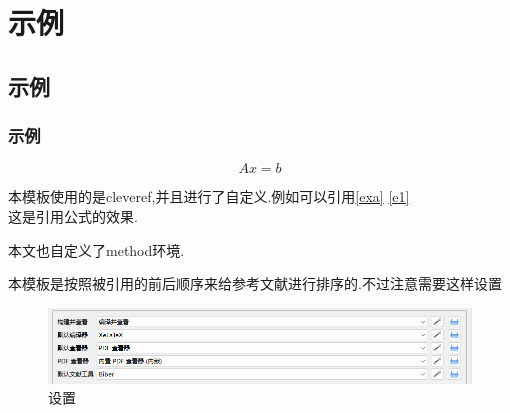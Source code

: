 \setlength{\parindent}{2em} %
\pagestyle{fancy}
\fancyhf{}
\fancyhead[C]{\leftmark}
\fancyfoot[C]{$\cdot$\thepage$\cdot$}
\renewcommand{\headrulewidth}{0.4pt}

\chapter{示例}
\section{示例}
\subsection{示例}

\begin{theorem}\label{exa}
	\begin{equation}\label{e1}
	Ax=b
 \end{equation}
\end{theorem}

\begin{definition}
	本模板使用的是cleveref,并且进行了自定义.例如可以引用\cref{exa} \cref{e1} \\
	这是引用公式的效果.
\end{definition}

\begin{method}
	本文也自定义了method环境.
\end{method}

\cite{1}本模板是按照被引用的前后顺序来给参考文献进行排序的\cite{2}.不过注意需要这样设置
\begin{figure}[h]
	\centering
	\begin{minipage}{0.65\linewidth}
		\includegraphics[width=\linewidth]{set.png}
		\caption{设置}
	\end{minipage}
\end{figure}
